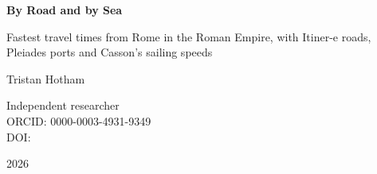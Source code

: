 \documentclass[11pt,a4paper]{article}
\begin{document}
\begin{center}
{\Large\bfseries By Road and by Sea\par}
\vspace{0.4em}
{\large Fastest travel times from Rome in the Roman Empire, with Itiner-e roads,\\Pleiades ports and Casson's sailing speeds\par}
\vspace{1.2em}
{\large Tristan Hotham\par}
\vspace{0.3em}
{\small Independent researcher\\
ORCID: 0000-0003-4931-9349\\
DOI: \par}
\vspace{0.8em}
2026
\end{center}
\end{document}
